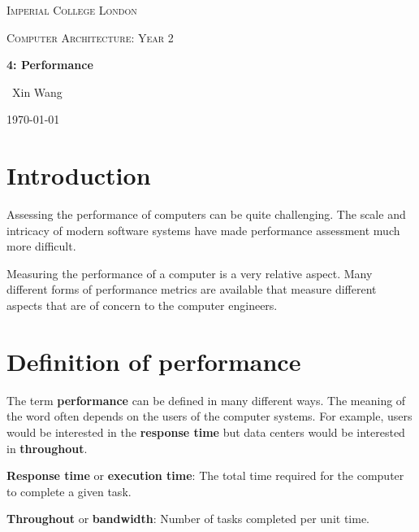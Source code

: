 \documentclass[10pt,a4paper]{article}
\begin{document}

\begin{titlepage}
	\centering
	{\scshape\LARGE Imperial College London \par}
	\vspace{1cm}
    {\scshape\Large Computer Architecture: Year 2\par}
    \vspace{1.5cm}
	{\huge\bfseries 4: Performance \par}
	\vspace{2cm}
	{\Large\ Xin Wang }
	\vfill
	{\large \today\par}
\end{titlepage}


\tableofcontents
\pagebreak

\section{Introduction}

Assessing the performance of computers can be quite challenging. The scale and intricacy of modern
software systems have made performance assessment much more difficult.

Measuring the performance of a computer is a very relative aspect. Many different forms of
performance metrics are available that measure different aspects that are of concern to the computer
engineers.

\section{Definition of performance}

The term \textbf{performance} can be defined in many different ways. The meaning of the word often
depends on the users of the computer systems. For example, users would be interested in the
\textbf{response time} but data centers would be interested in \textbf{throughout}.

\begin{tcolorbox}[breakable,colback=white]
    \textbf{Response time} or \textbf{execution time}: The total time required for the computer to
    complete a given task.
    
    \textbf{Throughout} or \textbf{bandwidth}: Number of tasks completed per unit time.
\end{tcolorbox}
\end{document}
